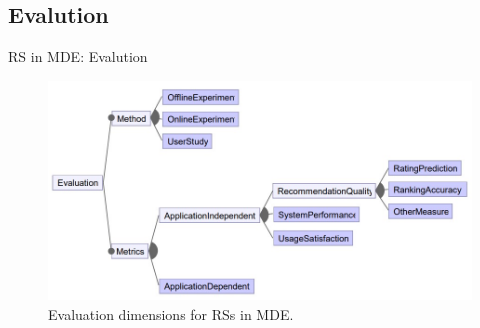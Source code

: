\documentclass{beamer}
\begin{document}
\subsection{Evalution}
\begin{frame}{RS in MDE: Evalution}
    \begin{figure}
        \centering
        \includegraphics[width = 0.9\linewidth]{RS4MDE-pic/evaluation.jpg}
        \caption{Evaluation dimensions for RSs in MDE.}
    \end{figure}
\end{frame}
\end{document}
